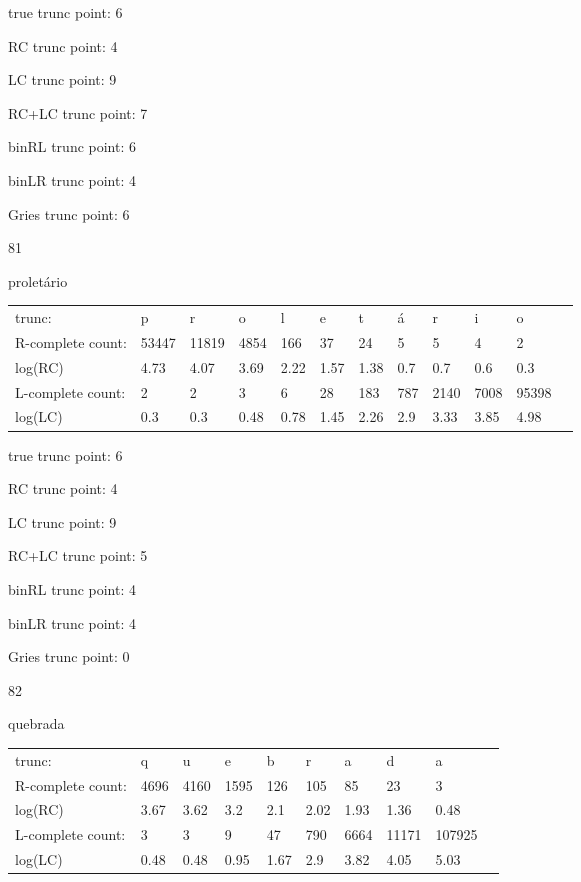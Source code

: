 \documentclass[10pt]{article}
\begin{document}
true trunc point: 6

RC trunc point: 4

LC trunc point: 9

RC+LC trunc point: 7

binRL trunc point: 6

binLR trunc point: 4

Gries trunc point: 6

\newpage

81

proletário

\begin{tabular}{l|lllllllllll}
trunc: & p & r & o & l & e & t & á & r & i & o & \\ 
R-complete count: & 53447 & 11819 & 4854 & 166 & 37 & 24 & 5 & 5 & 4 & 2 & \\ 
log(RC) & 4.73 & 4.07 & 3.69 & 2.22 & 1.57 & 1.38 & 0.7 & 0.7 & 0.6 & 0.3 & \\ 
L-complete count: & 2 & 2 & 3 & 6 & 28 & 183 & 787 & 2140 & 7008 & 95398 & \\ 
log(LC) & 0.3 & 0.3 & 0.48 & 0.78 & 1.45 & 2.26 & 2.9 & 3.33 & 3.85 & 4.98 & \\ 
\end{tabular}

true trunc point: 6

RC trunc point: 4

LC trunc point: 9

RC+LC trunc point: 5

binRL trunc point: 4

binLR trunc point: 4

Gries trunc point: 0

\vspace{1em}

82

quebrada

\begin{tabular}{l|lllllllll}
trunc: & q & u & e & b & r & a & d & a & \\ 
R-complete count: & 4696 & 4160 & 1595 & 126 & 105 & 85 & 23 & 3 & \\ 
log(RC) & 3.67 & 3.62 & 3.2 & 2.1 & 2.02 & 1.93 & 1.36 & 0.48 & \\ 
L-complete count: & 3 & 3 & 9 & 47 & 790 & 6664 & 11171 & 107925 & \\ 
log(LC) & 0.48 & 0.48 & 0.95 & 1.67 & 2.9 & 3.82 & 4.05 & 5.03 & \\ 
\end{tabular}
\end{document}
